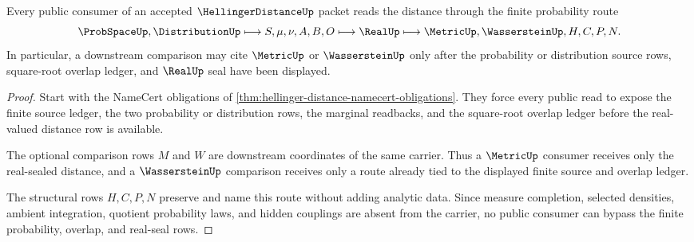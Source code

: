 \begin{theorem}
\label{thm:hellinger-distance-finite-probability-route}
Every public consumer of an accepted $\HellingerDistanceUp$ packet reads the distance through the finite probability route
$$
\ProbSpaceUp,\DistributionUp \longmapsto S,\mu,\nu,A,B,O \longmapsto \RealUp \longmapsto \MetricUp,\WassersteinUp,H,C,P,N .
$$
In particular, a downstream comparison may cite $\MetricUp$ or $\WassersteinUp$ only after the probability or distribution source rows, square-root overlap ledger, and $\RealUp$ seal have been displayed.
\end{theorem}
\begin{proof}
Start with the NameCert obligations of \autoref{thm:hellinger-distance-namecert-obligations}. They force every public read to expose the finite source ledger, the two probability or distribution rows, the marginal readbacks, and the square-root overlap ledger before the real-valued distance row is available.

The optional comparison rows $M$ and $W$ are downstream coordinates of the same carrier. Thus a $\MetricUp$ consumer receives only the real-sealed distance, and a $\WassersteinUp$ comparison receives only a route already tied to the displayed finite source and overlap ledger.

The structural rows $H,C,P,N$ preserve and name this route without adding analytic data. Since measure completion, selected densities, ambient integration, quotient probability laws, and hidden couplings are absent from the carrier, no public consumer can bypass the finite probability, overlap, and real-seal rows.
\end{proof}





